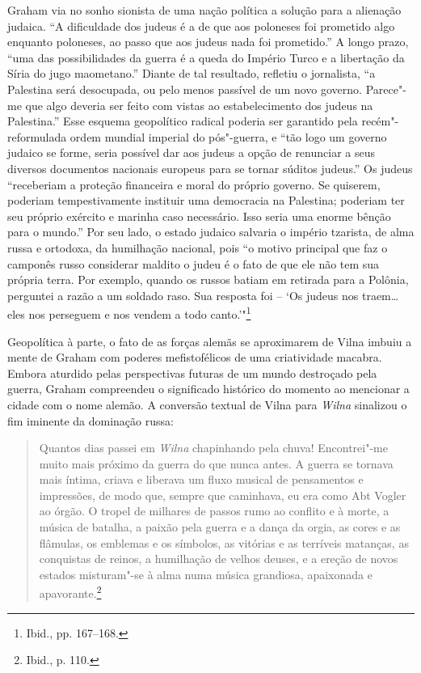 Graham via no sonho sionista de uma nação política a solução para a
alienação judaica. ``A dificuldade dos judeus é a de que aos poloneses
foi prometido algo enquanto poloneses, ao passo que aos judeus nada foi
prometido.'' A longo prazo, ``uma das possibilidades da guerra é a queda
do Império Turco e a libertação da Síria do jugo maometano.'' Diante de
tal resultado, refletiu o jornalista, ``a Palestina será desocupada, ou
pelo menos passível de um novo governo. Parece"-me que algo deveria ser
feito com vistas ao estabelecimento dos judeus na Palestina.'' Esse
esquema geopolítico radical poderia ser garantido pela recém"-reformulada
ordem mundial imperial do pós"-guerra, e ``tão logo um governo
judaico se forme, seria possível dar aos judeus a opção de
renunciar a seus diversos documentos nacionais europeus para se tornar
súditos judeus.'' Os judeus ``receberiam a proteção financeira e moral
do próprio governo. Se quiserem, poderiam tempestivamente instituir uma
democracia na Palestina; poderiam ter seu próprio exército e marinha
caso necessário. Isso seria uma enorme bênção para o mundo.'' Por seu
lado, o estado judaico salvaria o império tzarista, de alma russa e
ortodoxa, da humilhação nacional, pois ``o motivo principal que faz o
camponês russo considerar maldito o judeu é o fato de que ele não tem
sua própria terra. Por exemplo, quando os russos batiam em retirada para
a Polônia, perguntei a razão a um soldado raso. Sua resposta foi -- `Os
judeus nos traem\ldots{} eles nos perseguem e nos vendem a todo
canto.'"\footnote{Ibid., pp. 167--168.}

Geopolítica à parte, o fato de as forças alemãs se aproximarem de Vilna
imbuiu a mente de Graham com poderes mefistofélicos de uma criatividade
macabra. Embora aturdido pelas perspectivas futuras de um mundo
destroçado pela guerra, Graham compreendeu o significado histórico do
momento ao mencionar a cidade com o nome alemão. A conversão textual de
Vilna para \textit{Wilna} sinalizou o fim iminente da dominação russa:

\begin{quote}
Quantos dias passei em \textit{Wilna} chapinhando pela chuva! Encontrei"-me muito
mais próximo da guerra do que nunca antes. A guerra se tornava mais
íntima, criava e liberava um fluxo musical de pensamentos e impressões,
de modo que, sempre que caminhava, eu era como Abt Vogler ao órgão. O
tropel de milhares de passos rumo ao conflito e à morte, a música de
batalha, a paixão pela guerra e a dança da orgia, as cores e as
flâmulas, os emblemas e os símbolos, as vitórias e as terríveis
matanças, as conquistas de reinos, a humilhação de velhos deuses, e a
ereção de novos estados misturam"-se à alma numa música grandiosa,
apaixonada e apavorante.\footnote{Ibid., p. 110.}
\end{quote}


